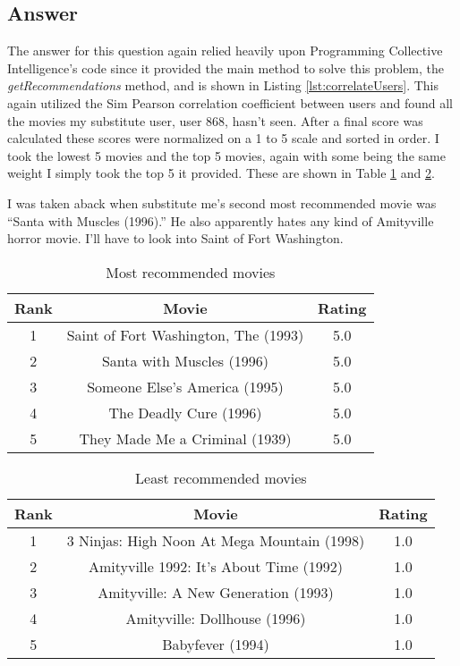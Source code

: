 \documentclass[letterpaper,11pt]{article}
\begin{document}
\subsection*{Answer}

The answer for this question again relied heavily upon Programming Collective Intelligence's code since it provided the main method to solve this problem, the \textit{getRecommendations} method, and is shown in Listing \ref{lst:correlateUsers}. This again utilized the Sim Pearson correlation coefficient between users and found all the movies my substitute user, user 868, hasn't seen. After a final score was calculated these scores were normalized on a 1 to 5 scale and sorted in order. I took the lowest 5 movies and the top 5 movies, again with some being the same weight I simply took the top 5 it provided. These are shown in Table \ref{table:q3most} and \ref{table:q3least}.

I was taken aback when substitute me's second most recommended movie was ``Santa with Muscles (1996).'' He also apparently hates any kind of Amityville horror movie. I'll have to look into Saint of Fort Washington.

\begin{table}[htb]
\centering
\begin{tabular}{ | c | c | c |}
\hline
\textbf{Rank} & \textbf{Movie} & \textbf{Rating} \\
\hline
1 & Saint of Fort Washington, The (1993) & 5.0 \\
\hline
2 & Santa with Muscles (1996) & 5.0 \\
\hline
3 & Someone Else's America (1995) & 5.0 \\ 
\hline
4 & The Deadly Cure (1996) & 5.0 \\
\hline
5 & They Made Me a Criminal (1939) & 5.0 \\
\hline
\end{tabular}
\caption{Most recommended movies}
\label{table:q3most}
\end{table}

\begin{table}[htb]
\centering
\begin{tabular}{ | c | c | c |}
\hline
\textbf{Rank} & \textbf{Movie} & \textbf{Rating} \\
\hline
1 & 3 Ninjas: High Noon At Mega Mountain (1998) & 1.0 \\
\hline
2 & Amityville 1992: It's About Time (1992) & 1.0 \\
\hline
3 & Amityville: A New Generation (1993) & 1.0 \\ 
\hline
4 & Amityville: Dollhouse (1996) & 1.0 \\
\hline
5 & Babyfever (1994) & 1.0 \\
\hline
\end{tabular}
\caption{Least recommended movies}
\label{table:q3least}
\end{table}
\end{document}
